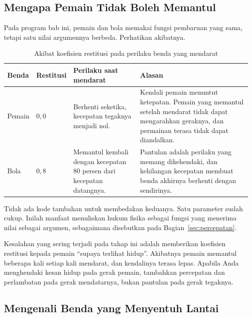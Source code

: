 \subsection{Mengapa Pemain Tidak Boleh Memantul}

Pada program bab ini, pemain dan bola memakai fungsi pembaruan yang sama,
tetapi satu nilai argumennya berbeda. Perhatikan akibatnya.

\begin{table}[htbp]
\centering
\caption{Akibat koefisien restitusi pada perilaku benda yang mendarat}
\label{tab:restitusi-benda}
{\setlength{\tabcolsep}{4pt}\footnotesize%
\begin{tabularx}{\textwidth}{@{}C{2.4cm} C{1.6cm} L{4.2cm} Y@{}}
\toprule
\headrow \textbf{Benda} & \textbf{Restitusi} & \textbf{Perilaku saat mendarat} & \textbf{Alasan} \\
\midrule
Pemain & $0{,}0$ &
Berhenti seketika, kecepatan tegaknya menjadi nol. &
Kendali pemain menuntut ketepatan. Pemain yang memantul setelah mendarat tidak
dapat mengarahkan geraknya, dan permainan terasa tidak dapat diandalkan. \\
\addlinespace
Bola & $0{,}8$ &
Memantul kembali dengan kecepatan 80 persen dari kecepatan datangnya. &
Pantulan adalah perilaku yang memang dikehendaki, dan kehilangan kecepatan
membuat benda akhirnya berhenti dengan sendirinya. \\
\bottomrule
\end{tabularx}}
\end{table}

Tidak ada kode tambahan untuk membedakan keduanya. Satu
parameter sudah cukup. Inilah manfaat menuliskan hukum fisika sebagai fungsi
yang menerima nilai sebagai argumen, sebagaimana disebutkan pada
Bagian~\ref{sec:percepatan}.

\begin{peringatanbox}
Kesalahan yang sering terjadi pada tahap ini adalah memberikan koefisien
restitusi kepada pemain ``supaya terlihat hidup''. Akibatnya pemain memantul
beberapa kali setiap kali mendarat, dan kendalinya terasa lepas. Apabila Anda
menghendaki kesan hidup pada gerak pemain, tambahkan percepatan dan
perlambatan pada gerak mendatarnya, bukan pantulan pada gerak tegaknya.
\end{peringatanbox}

\subsection{Mengenali Benda yang Menyentuh Lantai}

